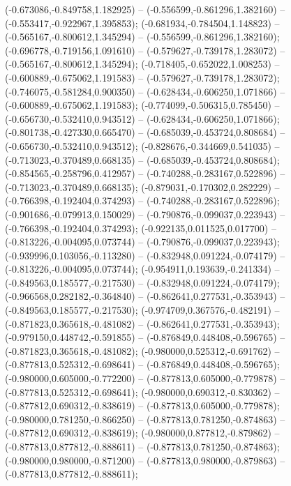  (-0.673086,-0.849758,1.182925) -- (-0.556599,-0.861296,1.382160) -- (-0.553417,-0.922967,1.395853);
 (-0.681934,-0.784504,1.148823) -- (-0.565167,-0.800612,1.345294) -- (-0.556599,-0.861296,1.382160);
 (-0.696778,-0.719156,1.091610) -- (-0.579627,-0.739178,1.283072) -- (-0.565167,-0.800612,1.345294);
 (-0.718405,-0.652022,1.008253) -- (-0.600889,-0.675062,1.191583) -- (-0.579627,-0.739178,1.283072);
 (-0.746075,-0.581284,0.900350) -- (-0.628434,-0.606250,1.071866) -- (-0.600889,-0.675062,1.191583);
 (-0.774099,-0.506315,0.785450) -- (-0.656730,-0.532410,0.943512) -- (-0.628434,-0.606250,1.071866);
 (-0.801738,-0.427330,0.665470) -- (-0.685039,-0.453724,0.808684) -- (-0.656730,-0.532410,0.943512);
 (-0.828676,-0.344669,0.541035) -- (-0.713023,-0.370489,0.668135) -- (-0.685039,-0.453724,0.808684);
 (-0.854565,-0.258796,0.412957) -- (-0.740288,-0.283167,0.522896) -- (-0.713023,-0.370489,0.668135);
 (-0.879031,-0.170302,0.282229) -- (-0.766398,-0.192404,0.374293) -- (-0.740288,-0.283167,0.522896);
 (-0.901686,-0.079913,0.150029) -- (-0.790876,-0.099037,0.223943) -- (-0.766398,-0.192404,0.374293);
 (-0.922135,0.011525,0.017700) -- (-0.813226,-0.004095,0.073744) -- (-0.790876,-0.099037,0.223943);
 (-0.939996,0.103056,-0.113280) -- (-0.832948,0.091224,-0.074179) -- (-0.813226,-0.004095,0.073744);
 (-0.954911,0.193639,-0.241334) -- (-0.849563,0.185577,-0.217530) -- (-0.832948,0.091224,-0.074179);
 (-0.966568,0.282182,-0.364840) -- (-0.862641,0.277531,-0.353943) -- (-0.849563,0.185577,-0.217530);
 (-0.974709,0.367576,-0.482191) -- (-0.871823,0.365618,-0.481082) -- (-0.862641,0.277531,-0.353943);
 (-0.979150,0.448742,-0.591855) -- (-0.876849,0.448408,-0.596765) -- (-0.871823,0.365618,-0.481082);
 (-0.980000,0.525312,-0.691762) -- (-0.877813,0.525312,-0.698641) -- (-0.876849,0.448408,-0.596765);
 (-0.980000,0.605000,-0.772200) -- (-0.877813,0.605000,-0.779878) -- (-0.877813,0.525312,-0.698641);
 (-0.980000,0.690312,-0.830362) -- (-0.877812,0.690312,-0.838619) -- (-0.877813,0.605000,-0.779878);
 (-0.980000,0.781250,-0.866250) -- (-0.877813,0.781250,-0.874863) -- (-0.877812,0.690312,-0.838619);
 (-0.980000,0.877812,-0.879862) -- (-0.877813,0.877812,-0.888611) -- (-0.877813,0.781250,-0.874863);
 (-0.980000,0.980000,-0.871200) -- (-0.877813,0.980000,-0.879863) -- (-0.877813,0.877812,-0.888611);
